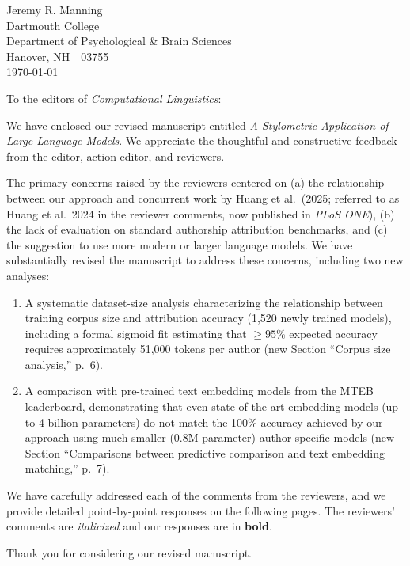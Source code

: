 \documentclass[11pt]{article}
\newcommand{\pref}[1]{p.~#1}
\begin{document}
\begin{flushright}
Jeremy R. Manning \\
Dartmouth College \\
Department of Psychological \& Brain Sciences \\
Hanover, NH~~03755 \\[1em]
\today
\end{flushright}

To the editors of \textit{Computational Linguistics}:

We have enclosed our revised manuscript entitled \textit{A Stylometric
Application of Large Language Models}. We appreciate the thoughtful and
constructive feedback from the editor, action editor, and reviewers.

The primary concerns raised by the reviewers centered on (a) the relationship
between our approach and concurrent work by Huang et al.\ (2025; referred to as
Huang et al.\ 2024 in the reviewer comments, now published in \textit{PLoS
ONE}), (b) the lack of evaluation on standard authorship attribution
benchmarks, and (c) the suggestion to use more modern or larger language
models. We have substantially revised the manuscript to address these concerns,
including two new analyses:

\begin{enumerate}
\item A systematic dataset-size analysis characterizing the relationship between training corpus size and attribution accuracy (1,520 newly trained models), including a formal sigmoid fit estimating that $\geq 95\%$ expected accuracy requires approximately 51,000 tokens per author (new Section ``Corpus size analysis,'' \pref{6}).
\item A comparison with pre-trained text embedding models from the MTEB leaderboard, demonstrating that even state-of-the-art embedding models (up to 4 billion parameters) do not match the 100\% accuracy achieved by our approach using much smaller (0.8M parameter) author-specific models (new Section ``Comparisons between predictive comparison and text embedding matching,'' \pref{7}).
\end{enumerate}

We have carefully addressed each of the comments from the reviewers, and we
provide detailed point-by-point responses on the following pages. The
reviewers' comments are \textit{italicized} and our responses are in
\textbf{bold}.

Thank you for considering our revised manuscript.
\end{document}
